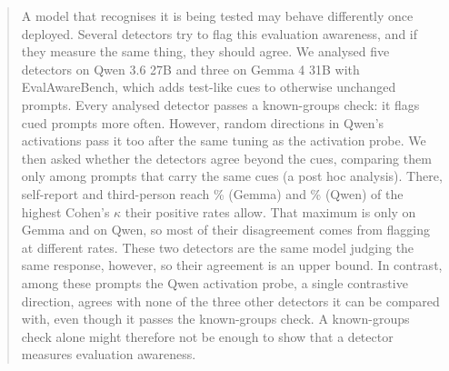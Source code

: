 \begin{abstract}
A model that recognises it is being tested may behave differently once deployed. Several
detectors try to flag this evaluation awareness, and if they measure the same thing,
they should agree. We analysed five detectors on Qwen 3.6 27B and three on Gemma 4 31B with
EvalAwareBench, which adds test-like cues to otherwise unchanged prompts. Every analysed
detector passes a known-groups check: it flags cued prompts more often. However,
 random directions in Qwen's activations pass it too after the same tuning as
the activation probe. We then asked whether the detectors agree beyond the cues,
comparing them only among prompts that carry the same cues (a post hoc analysis). There, self-report and third-person reach
\% (Gemma) and \% (Qwen) of the
highest Cohen's $\kappa$ their positive rates allow. That maximum is only
 on Gemma and  on Qwen, so most of
their disagreement comes from flagging at different rates. These two detectors are the same
model judging the same response, however, so their agreement is an upper bound. In contrast,
among these prompts the Qwen activation probe, a single contrastive direction,
agrees with none of the three other detectors it can be compared with, even though it passes
the known-groups check. A known-groups check alone might therefore not be enough to show that a
detector measures evaluation awareness.
\end{abstract}
